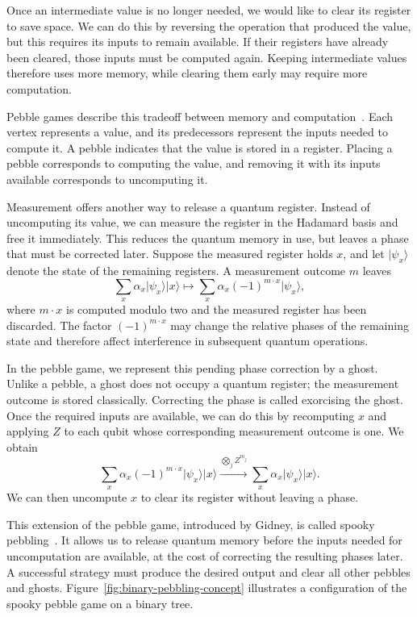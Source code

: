 \documentclass[11pt]{article}
\theoremstyle{definition}
\theoremstyle{remark}
\newcommand{\ket}[1]{\lvert#1\rangle}
\begin{document}
Once an intermediate value is no longer needed, we would like to clear its register to save space. We can do this by reversing the operation that produced the value, but this requires its inputs to remain available. If their registers have already been cleared, those inputs must be computed again. Keeping intermediate values therefore uses more memory, while clearing them early may require more computation.

Pebble games describe this tradeoff between memory and computation~\cite{Bennett1989}. Each vertex represents a value, and its predecessors represent the inputs needed to compute it. A pebble indicates that the value is stored in a register. Placing a pebble corresponds to computing the value, and removing it with its inputs available corresponds to uncomputing it.

Measurement offers another way to release a quantum register. Instead of uncomputing its value, we can measure the register in the Hadamard basis and free it immediately. This reduces the quantum memory in use, but leaves a phase that must be corrected later. Suppose the measured register holds $x$, and let $\ket{\psi_x}$ denote the state of the remaining registers. A measurement outcome $m$ leaves
\begin{equation}
    \sum_x \alpha_x\ket{\psi_x}\ket{x} \longmapsto \sum_x \alpha_x(-1)^{m\cdot x}\ket{\psi_x},
\end{equation}
where $m\cdot x$ is computed modulo two and the measured register has been discarded. The factor $(-1)^{m\cdot x}$ may change the relative phases of the remaining state and therefore affect interference in subsequent quantum operations.

In the pebble game, we represent this pending phase correction by a ghost. Unlike a pebble, a ghost does not occupy a quantum register; the measurement outcome is stored classically. Correcting the phase is called exorcising the ghost. Once the required inputs are available, we can do this by recomputing $x$ and applying $Z$ to each qubit whose corresponding measurement outcome is one. We obtain
\begin{equation}
    \sum_x \alpha_x(-1)^{m\cdot x}\ket{\psi_x}\ket{x} \xrightarrow{\bigotimes_j Z^{m_j}} \sum_x \alpha_x\ket{\psi_x}\ket{x}.
\end{equation}
We can then uncompute $x$ to clear its register without leaving a phase.

This extension of the pebble game, introduced by Gidney, is called spooky pebbling~\cite{Gidney2019}. It allows us to release quantum memory before the inputs needed for uncomputation are available, at the cost of correcting the resulting phases later. A successful strategy must produce the desired output and clear all other pebbles and ghosts. Figure~\ref{fig:binary-pebbling-concept} illustrates a configuration of the spooky pebble game on a binary tree.
\end{document}
